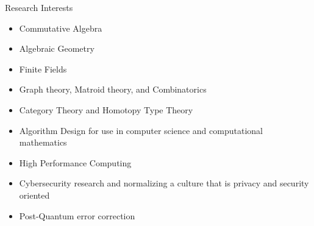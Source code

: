 \documentclass{resume} %
\begin{document}

\begin{rSection}{Research Interests}
    \begin{multicols}{2}
      \begin{itemize}
        \item Commutative Algebra

        \item Algebraic Geometry

        \item Finite Fields

        \item Graph theory, Matroid theory, and Combinatorics

        \item Category Theory and Homotopy Type Theory

        \item Algorithm Design for use in computer science and computational
            mathematics

        \item High Performance Computing

        \item Cybersecurity research and normalizing a culture that is privacy
            and security oriented

        \item Post-Quantum error correction
      \end{itemize}
    \end{multicols}
\end{rSection}
\end{document}
